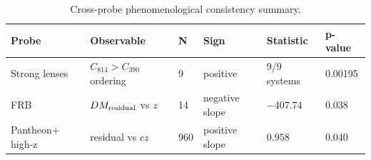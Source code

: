 
\begin{table}[t]
\centering
\caption{Cross-probe phenomenological consistency summary.}
\begin{tabular}{llllll}
\hline
Probe & Observable & N & Sign & Statistic & p-value \\
\hline
Strong lenses & $C_{814}>C_{390}$ ordering & 9 & positive & 9/9 systems & 0.00195 \\
FRB & $DM_{\rm residual}$ vs $z$ & 14 & negative slope & $-407.74$ & 0.038 \\
Pantheon+ high-z & residual vs $c z$ & 960 & positive slope & $0.958$ & 0.040 \\
\hline
\end{tabular}
\label{tab:cross_probe_summary}
\end{table}
